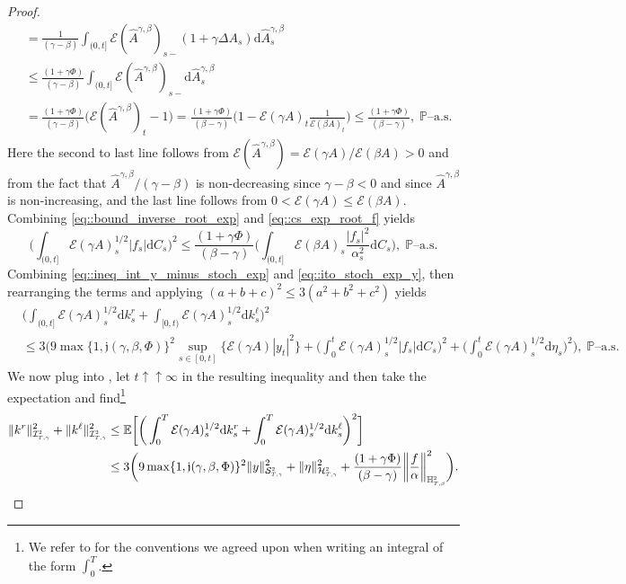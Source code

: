 \documentclass[10pt]{article} %
\newcommand\cE{\mathcal E}
\newcommand\cH{\mathcal H}
\newcommand\cI{\mathcal I}
\newcommand\cS{\mathcal S}
\newcommand{\smalltext}[1]{\text{\fontsize{4}{4}\selectfont$#1$}}
\def \E{\mathbb{E}}
\def \H{\mathbb{H}}
\def \P{\mathbb{P}}
\newcommand{\1}{\mathbf{1}}
\def\d{\mathrm{d}}
\begin{document}
\begin{proof}
\begin{align}
		&= \frac{1}{(\gamma-\beta)}\int_{(0,t]} \cE(\widehat A^{\gamma,\beta})_{s-}(1+\gamma\Delta A_s) \d \widehat A^{\gamma,\beta}_s \nonumber\\
		&\leq \frac{(1+\gamma\Phi)}{(\gamma-\beta)}\int_{(0,t]} \cE(\widehat A^{\gamma,\beta})_{s-} \d \widehat A^{\gamma,\beta}_s \nonumber\\
		&= \frac{(1+\gamma\Phi)}{(\gamma-\beta)}\big(\cE(\widehat A^{\gamma,\beta})_t - 1\big) = \frac{(1+\gamma\Phi)}{(\beta-\gamma)}\bigg(1-\cE(\gamma A)_t\frac{1}{\cE(\beta A)_t}\bigg) \leq \frac{(1+\gamma\Phi)}{(\beta-\gamma)}, \; \text{$\P$--a.s.}
	\end{align}
	Here the second to last line follows from $\cE(\widehat A^{\gamma,\beta}) = \cE(\gamma A)/\cE(\beta A) > 0$ and from the fact that $\widehat A^{\gamma,\beta} / (\gamma-\beta)$ is non-decreasing since $\gamma-\beta < 0$ and since $\widehat A^{\gamma,\beta}$ is non-increasing, and the last line follows from $0 < \cE(\gamma A) \leq \cE(\beta A)$. Combining \eqref{eq::bound_inverse_root_exp} and \eqref{eq::cs_exp_root_f} yields 
	\begin{equation}\label{eq::ineq_exp_root_f}
		\bigg(\int_{(0,t]} \cE(\gamma A)^{1/2}_s |f_s| \d C_s\bigg)^2 
		\leq \frac{(1+\gamma\Phi)}{(\beta-\gamma)} \bigg(\int_{(0,t]} \cE(\beta A)_s \frac{|f_s|^2}{\alpha^2_s} \d C_s\bigg), \; \text{$\P$--a.s.}
	\end{equation}
	Combining \eqref{eq::ineq_int_y_minus_stoch_exp} and \eqref{eq::ito_stoch_exp_y}, then rearranging the terms and applying $(a+b+c)^2 \leq 3(a^2+b^2+c^2)$ yields
	\begin{align}\label{eq::estimate_k}
		&\bigg(\int_{(0,t]}\cE(\gamma A)^{1/2}_s \d k^r_s + \int_{[0,t)} \cE(\gamma A)^{1/2}_s \d k^\ell_s\bigg)^2 \nonumber\\
		&\leq 3\Bigg( 9\max\{1, \mathfrak{j}(\gamma,\beta,\Phi)\}^2 \sup_{s \in [0,t]}\{\cE(\gamma A)|y_t|^2\} + \bigg(\int_0^t \cE(\gamma A)^{1/2}_s |f_s| \d C_s\bigg)^2 + \bigg(\int_0^t \cE(\gamma A)^{1/2}_s \d\eta_s\bigg)^2\Bigg), \; \text{$\P$--a.s.}
	\end{align}
	We now plug  into , let $t \uparrow\uparrow \infty$ in the resulting inequality and then take the expectation and find\footnote{We refer to  for the conventions we agreed upon when writing an integral of the form $\int_0^T$.}
	\begin{align*}
		\|k^r\|^2_{\cI^\smalltext{2}_{\smalltext{T}\smalltext{,}\smalltext{\gamma}}} + \|k^\ell\|^2_{\cI^\smalltext{2}_{\smalltext{T}\smalltext{,}\smalltext{\gamma}}} 
		&\leq \E\bigg[\bigg(\int_0^T\cE(\gamma A)^{1/2}_s \d k^r_s + \int_0^T \cE(\gamma A)^{1/2}_s \d k^\ell_s\bigg)^2\bigg] \\
		&\leq 3\bigg(9\max\{1,\mathfrak{j}(\gamma,\beta,\Phi)\}^2\|y\|^2_{\cS^\smalltext{2}_{\smalltext{T}\smalltext{,}\smalltext{\gamma}}} + \|\eta\|^2_{\cH^\smalltext{2}_{\smalltext{T}\smalltext{,}\smalltext{\gamma}}} + \frac{(1+\gamma\Phi)}{(\beta-\gamma)}\bigg\|\frac{f}{\alpha}\bigg\|^2_{\H^\smalltext{2}_{\smalltext{T}\smalltext{,}\smalltext{\beta}}}  \bigg).
	\end{align*}
	

\end{proof}
\end{document}
